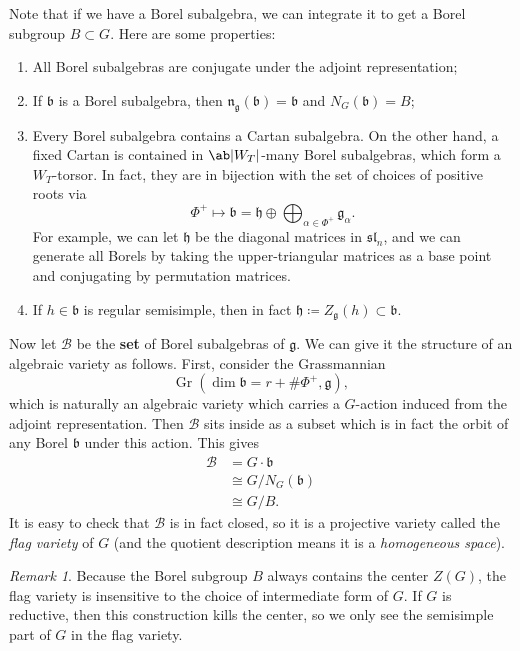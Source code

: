 \documentclass{amsart}
\theoremstyle{definition}
\theoremstyle{remark}
\newtheorem{rmk}[thm]{Remark}
\theoremstyle{plain}
\theoremstyle{definition}
\theoremstyle{remark}
\newcommand{\g}{\mathfrak{g}}
\newcommand{\h}{\mathfrak{h}}
\newcommand{\n}{\mathfrak{n}}
\renewcommand{\b}{\mathfrak{b}}
\newcommand{\mc}[1]{\mathcal{#1}}
\newcommand{\mf}[1]{\mathfrak{#1}}
\newcommand{\on}[1]{\operatorname{#1}}
\newcommand{\1}{\mathbf{1}}
\newcommand{\2}{\mathbf{2}}
\newcommand{\3}{\mathbf{3}}
\renewcommand{\sl}{\mf{sl}}
\begin{document}
Note that if we have a Borel subalgebra, we can integrate it to get a Borel subgroup \(B \subset G\). Here are some properties:
\begin{enumerate}
    \item All Borel subalgebras are conjugate under the adjoint representation;
    \item If \(\b\) is a Borel subalgebra, then \(\n_{\g}(\b) = \b\) and \(N_G(\b) = B\);
    \item Every Borel subalgebra contains a Cartan subalgebra. On the other hand, a fixed Cartan is contained in \(\ab|W_T|\)-many Borel subalgebras, which form a \(W_T\)-torsor. In fact, they are in bijection with the set of choices of positive roots via
    \[ \Phi^+ \mapsto \b = \h \oplus \bigoplus_{\alpha \in \Phi^+} \g_{\alpha}. \]
    For example, we can let \(\h\) be the diagonal matrices in \(\sl_n\), and we can generate all Borels by taking the upper-triangular matrices as a base point and conjugating by permutation matrices.
    \item If \(h \in \b\) is regular semisimple, then in fact \(\h \coloneqq Z_{\g}(h) \subset \b\).
\end{enumerate}

Now let \(\mc{B}\) be the \textbf{set} of Borel subalgebras of \(\g\). We can give it the structure of an algebraic variety as follows. First, consider the Grassmannian
\[ \on{Gr}(\dim \b = r + \# \Phi^+, \g), \]
which is naturally an algebraic variety which carries a \(G\)-action induced from the adjoint representation. Then \(\mc{B}\) sits inside as a subset which is in fact the orbit of any Borel \(\b\) under this action. This gives
\begin{align*}
    \mc{B} &= G \cdot \b \\
    &\cong G / N_G(\b) \\
    &\cong G / B.
\end{align*}
It is easy to check that \(\mc{B}\) is in fact closed, so it is a projective variety called the \textit{flag variety} of \(G\) (and the quotient description means it is a \textit{homogeneous space}).

\begin{rmk}
    Because the Borel subgroup \(B\) always contains the center \(Z(G)\), the flag variety is insensitive to the choice of intermediate form of \(G\). If \(G\) is reductive, then this construction kills the center, so we only see the semisimple part of \(G\) in the flag variety.
\end{rmk}
\end{document}
